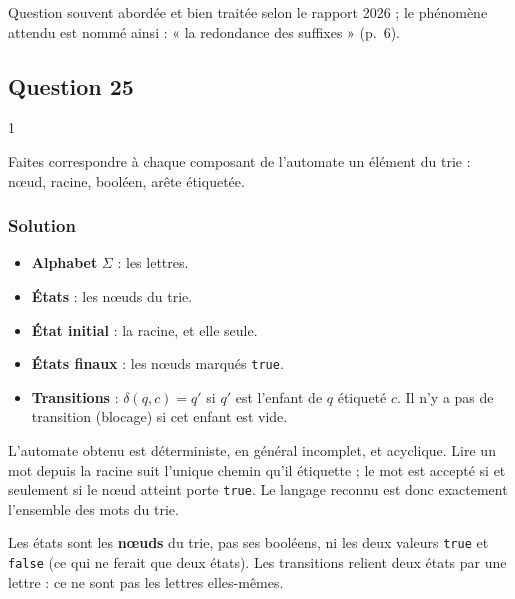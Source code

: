 \documentclass[11pt,a4paper]{article}
\providecommand{\tightlist}{\setlength{\itemsep}{0pt}\setlength{\parskip}{0pt}}
\begin{document}
\begin{jury}

Question souvent abordée et bien traitée selon le rapport 2026 ; le phénomène attendu est nommé ainsi : « la redondance des suffixes » (p.~6).

\end{jury}

\hypertarget{question-25}{%
\subsection{Question 25}\label{question-25}}

\begin{indication}{1}

Faites correspondre à chaque composant de l'automate un élément du trie : nœud, racine, booléen, arête étiquetée.

\end{indication}

\hypertarget{solution-24}{%
\subsubsection{Solution}\label{solution-24}}

\begin{itemize}
\tightlist
\item
  \textbf{Alphabet} \(\Sigma\) : les lettres.
\item
  \textbf{États} : les nœuds du trie.
\item
  \textbf{État initial} : la racine, et elle seule.
\item
  \textbf{États finaux} : les nœuds marqués \texttt{true}.
\item
  \textbf{Transitions} : \(\delta(q, c) = q'\) si \(q'\) est l'enfant de \(q\) étiqueté \(c\). Il n'y a pas de transition (blocage) si cet enfant est vide.
\end{itemize}

L'automate obtenu est déterministe, en général incomplet, et acyclique. Lire un mot depuis la racine suit l'unique chemin qu'il étiquette ; le mot est accepté si et seulement si le nœud atteint porte \texttt{true}. Le langage reconnu est donc exactement l'ensemble des mots du trie.

\begin{piege}

Les états sont les \textbf{nœuds} du trie, pas ses booléens, ni les deux valeurs \texttt{true} et \texttt{false} (ce qui ne ferait que deux états). Les transitions relient deux états par une lettre : ce ne sont pas les lettres elles-mêmes.

\end{piege}
\end{document}
